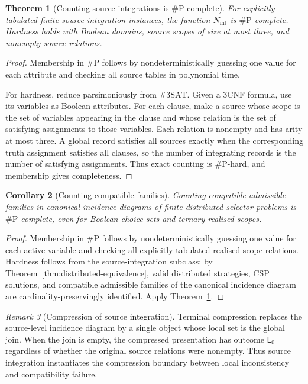 \documentclass[11pt]{article}
\theoremstyle{plain}
\newtheorem{theorem}{Theorem}[section]
\newtheorem{corollary}[theorem]{Corollary}
\theoremstyle{definition}
\theoremstyle{remark}
\newtheorem{remark}[theorem]{Remark}
\begin{document}
\begin{theorem}[Counting source integrations is $\#\mathrm P$-complete]
\label{thm:source-integration-sharpP}
For explicitly tabulated finite source-integration instances, the function
$N_{\mathrm{int}}$ is $\#\mathrm P$-complete. Hardness holds with Boolean
domains, source scopes of size at most three, and nonempty source relations.
\end{theorem}

\begin{proof}
Membership in $\#\mathrm P$ follows by nondeterministically guessing one value
for each attribute and checking all source tables in polynomial time.

For hardness, reduce parsimoniously from $\#3\mathrm{SAT}$. Given a 3CNF formula,
use its variables as Boolean attributes. For each clause, make a source whose
scope is the set of variables appearing in the clause and whose relation is
the set of satisfying assignments to those variables. Each relation is nonempty
and has arity at most three. A global record satisfies all sources exactly when
the corresponding truth assignment satisfies all clauses, so the number of
integrating records is the number of satisfying assignments. Thus exact counting
is $\#\mathrm P$-hard, and membership gives completeness.
\end{proof}

\begin{corollary}[Counting compatible families]
\label{cor:counting-compatible-families}
Counting compatible admissible families in canonical incidence diagrams of
finite distributed selector problems is $\#\mathrm P$-complete, even for Boolean
choice sets and ternary realised scopes.
\end{corollary}

\begin{proof}
Membership in $\#\mathrm P$ follows by nondeterministically guessing one value
for each active variable and checking all explicitly tabulated realised-scope
relations. Hardness follows from the source-integration subclass: by
Theorem~\ref{thm:distributed-equivalence}, valid distributed strategies, CSP
solutions, and compatible admissible families of the canonical incidence diagram
are cardinality-preservingly identified. Apply
Theorem~\ref{thm:source-integration-sharpP}.
\end{proof}

\begin{remark}[Compression of source integration]
Terminal compression replaces the source-level incidence diagram by a single
object whose local set is the global join. When the join is empty, the compressed
presentation has outcome $\mathsf L_0$ regardless of whether the original source
relations were nonempty. Thus source integration instantiates the compression
boundary between local inconsistency and compatibility failure.
\end{remark}
\end{document}
